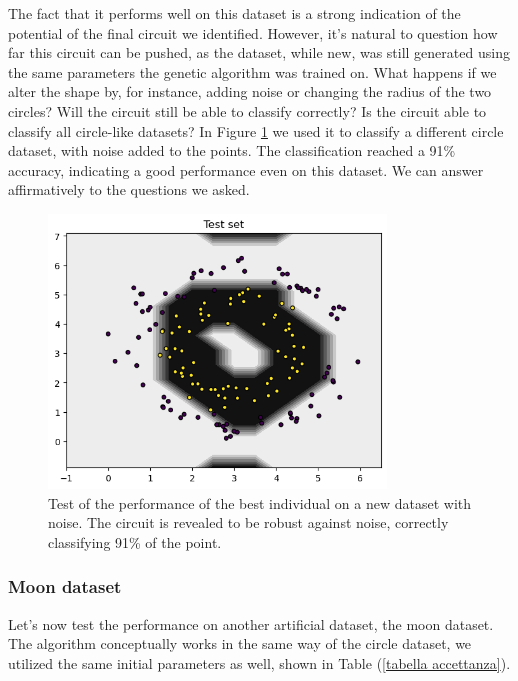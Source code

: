 \documentclass[12pt]{article}
\begin{document}
The fact that it performs well on this dataset is a strong indication of the potential of the final circuit we identified. However, it's natural to question how far this circuit can be pushed, as the dataset, while new, was still generated using the same parameters the genetic algorithm was trained on. What happens if we alter the shape by, for instance, adding noise or changing the radius of the two circles? Will the circuit still be able to classify correctly? Is the circuit able to classify all circle-like datasets? In Figure \ref{fig:noise} we used it to classify a different circle dataset, with noise added to the points. The classification reached a 91\% accuracy, indicating a good performance even on this dataset. We can answer affirmatively to the questions we asked.  
\begin{figure}[h!]
    \centering
    \includegraphics[width=0.8\textwidth]{images/noise.png}
    \caption{Test of the performance of the best individual on a new dataset with noise. The circuit is revealed to be robust against noise, correctly classifying 91\% of the point.}
    \label{fig:noise}
\end{figure}

\subsubsection{Moon dataset}

Let's now test the performance on another artificial dataset, the moon dataset. The algorithm conceptually works in the same way of the circle dataset, we utilized the same initial parameters as well, shown in Table (\ref{tabella accettanza}).
\end{document}
